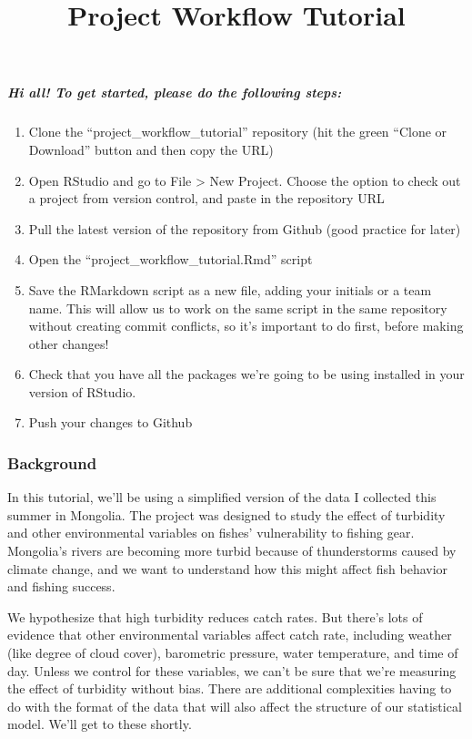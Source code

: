 \documentclass[]{article}
\title{Project Workflow Tutorial}
\author{}
\date{}
\providecommand{\tightlist}{%
  \setlength{\itemsep}{0pt}\setlength{\parskip}{0pt}}
\let\oldsubparagraph\subparagraph
\renewcommand{\subparagraph}[1]{\oldsubparagraph{#1}\mbox{}}
\begin{document}
\maketitle

\hypertarget{hi-all-to-get-started-please-do-the-following-steps}{%
\subparagraph{Hi all! To get started, please do the following
steps:}\label{hi-all-to-get-started-please-do-the-following-steps}}

\begin{enumerate}
\def\labelenumi{\arabic{enumi}.}
\tightlist
\item
  Clone the ``project\_workflow\_tutorial'' repository (hit the green
  ``Clone or Download'' button and then copy the URL)
\item
  Open RStudio and go to File \textgreater{} New Project. Choose the
  option to check out a project from version control, and paste in the
  repository URL
\item
  Pull the latest version of the repository from Github (good practice
  for later)
\item
  Open the ``project\_workflow\_tutorial.Rmd'' script
\item
  Save the RMarkdown script as a new file, adding your initials or a
  team name. This will allow us to work on the same script in the same
  repository without creating commit conflicts, so it's important to do
  first, before making other changes!
\item
  Check that you have all the packages we're going to be using installed
  in your version of RStudio.
\item
  Push your changes to Github
\end{enumerate}

\hypertarget{background}{%
\subsubsection{Background}\label{background}}

In this tutorial, we'll be using a simplified version of the data I
collected this summer in Mongolia. The project was designed to study the
effect of turbidity and other environmental variables on fishes'
vulnerability to fishing gear. Mongolia's rivers are becoming more
turbid because of thunderstorms caused by climate change, and we want to
understand how this might affect fish behavior and fishing success.

We hypothesize that high turbidity reduces catch rates. But there's lots
of evidence that other environmental variables affect catch rate,
including weather (like degree of cloud cover), barometric pressure,
water temperature, and time of day. Unless we control for these
variables, we can't be sure that we're measuring the effect of turbidity
without bias. There are additional complexities having to do with the
format of the data that will also affect the structure of our
statistical model. We'll get to these shortly.
\end{document}
